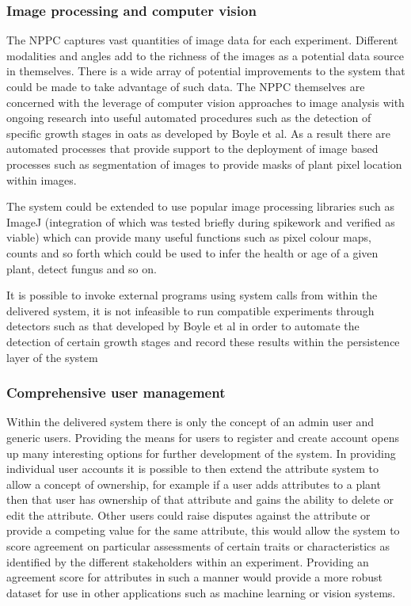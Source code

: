 \subsubsection{Image processing and computer vision}
The NPPC captures vast quantities of image data for each experiment. Different modalities and angles add to the richness of the images as a potential data source in themselves. There is a wide array of potential improvements to the system that could be made to take advantage of such data. The NPPC themselves are concerned with the leverage of computer vision approaches to image analysis with ongoing research into useful automated procedures such as the detection of specific growth stages in oats as developed by Boyle et al\cite{boyle_image-based_2015}. As a result there are automated processes that provide support to the deployment of image based processes such as segmentation of images to provide masks of plant pixel location within images.

The system could be extended to use popular image processing libraries such as ImageJ (integration of which was tested briefly during spikework and verified as viable) which can provide many useful functions such as pixel colour maps, counts and so forth which could be used to infer the health or age of a given plant, detect fungus and so on. 

It is possible to invoke external programs using system calls from within the delivered system, it is not infeasible to run compatible experiments through detectors such as that developed by Boyle et al\cite{boyle_image-based_2015} in order to automate the detection of certain growth stages and record these results within the persistence layer of the system


\subsubsection{Comprehensive user management}
Within the delivered system there is only the concept of an admin user and generic users. Providing the means for users to register and create account opens up many interesting options for further development of the system. In providing individual user accounts it is possible to then extend the attribute system to allow a concept of ownership, for example if a user adds attributes to a plant then that user has ownership of that attribute and gains the ability to delete or edit the attribute. Other users could raise disputes against the attribute or provide a competing value for the same attribute, this would allow the system to score agreement on particular assessments of certain traits or characteristics as identified by the different stakeholders within an experiment. Providing an agreement score for attributes in such a manner would provide a more robust dataset for use in other applications such as machine learning or vision systems.

